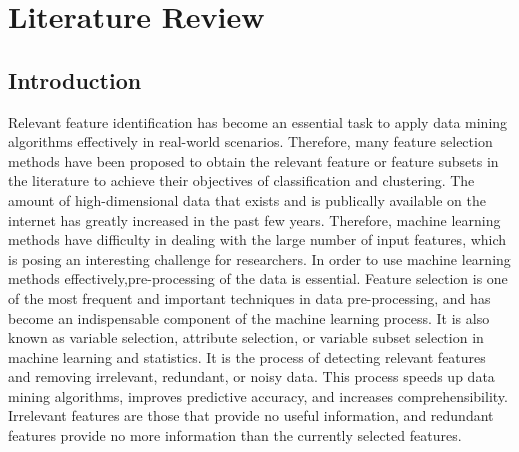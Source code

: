 \documentclass[document.tex]{subfiles}
\begin{document}
\chapter{Literature Review}

\section{Introduction}
\noindent Relevant feature identification has become an essential task to apply data mining algorithms effectively in real-world scenarios. Therefore, many feature selection methods have been proposed to obtain the relevant feature or feature subsets in the literature to achieve their objectives of classification and clustering.
The amount of high-dimensional data that exists and is publically available on the internet has greatly increased in the past few years. Therefore, machine learning methods have difficulty in dealing with the large number of input features, which is posing an interesting challenge for researchers. In order to use machine learning methods effectively,pre-processing of the data is essential. Feature selection is one of the most frequent and important techniques in data pre-processing\cite{2}, and has become an indispensable component of the machine learning process. It is also known as variable selection, attribute selection, or variable subset selection in machine learning and statistics. It is the process of detecting relevant features and removing irrelevant, redundant, or noisy data. This process speeds up data mining algorithms, improves predictive accuracy, and increases
comprehensibility. Irrelevant features are those that provide no useful information, and
redundant features provide no more information than the currently selected features.
\end{document}

